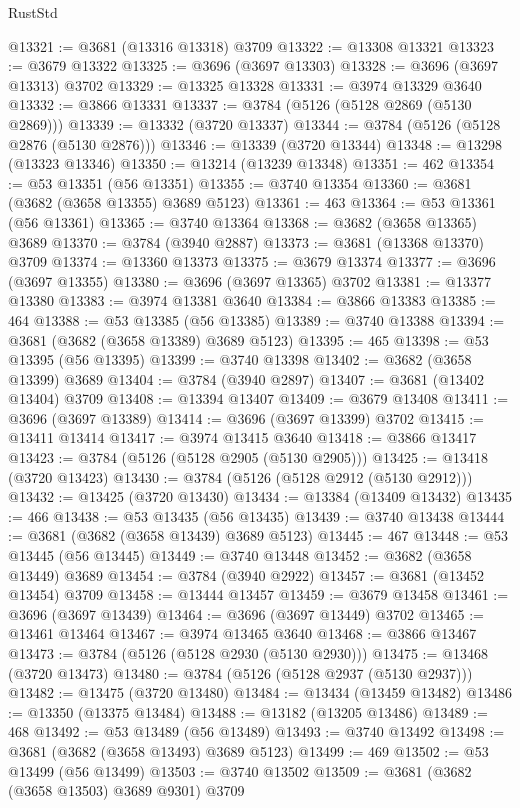 \begin{lexlean}{RustStd}
\begin{coremodule}
@13321 := @3681 (@13316 @13318) @3709
@13322 := @13308 @13321
@13323 := @3679 @13322
@13325 := @3696 (@3697 @13303)
@13328 := @3696 (@3697 @13313) @3702
@13329 := @13325 @13328
@13331 := @3974 @13329 @3640
@13332 := @3866 @13331
@13337 := @3784 (@5126 (@5128 @2869 (@5130 @2869)))
@13339 := @13332 (@3720 @13337)
@13344 := @3784 (@5126 (@5128 @2876 (@5130 @2876)))
@13346 := @13339 (@3720 @13344)
@13348 := @13298 (@13323 @13346)
@13350 := @13214 (@13239 @13348)
@13351 := 462
@13354 := @53 @13351 (@56 @13351)
@13355 := @3740 @13354
@13360 := @3681 (@3682 (@3658 @13355) @3689 @5123)
@13361 := 463
@13364 := @53 @13361 (@56 @13361)
@13365 := @3740 @13364
@13368 := @3682 (@3658 @13365) @3689
@13370 := @3784 (@3940 @2887)
@13373 := @3681 (@13368 @13370) @3709
@13374 := @13360 @13373
@13375 := @3679 @13374
@13377 := @3696 (@3697 @13355)
@13380 := @3696 (@3697 @13365) @3702
@13381 := @13377 @13380
@13383 := @3974 @13381 @3640
@13384 := @3866 @13383
@13385 := 464
@13388 := @53 @13385 (@56 @13385)
@13389 := @3740 @13388
@13394 := @3681 (@3682 (@3658 @13389) @3689 @5123)
@13395 := 465
@13398 := @53 @13395 (@56 @13395)
@13399 := @3740 @13398
@13402 := @3682 (@3658 @13399) @3689
@13404 := @3784 (@3940 @2897)
@13407 := @3681 (@13402 @13404) @3709
@13408 := @13394 @13407
@13409 := @3679 @13408
@13411 := @3696 (@3697 @13389)
@13414 := @3696 (@3697 @13399) @3702
@13415 := @13411 @13414
@13417 := @3974 @13415 @3640
@13418 := @3866 @13417
@13423 := @3784 (@5126 (@5128 @2905 (@5130 @2905)))
@13425 := @13418 (@3720 @13423)
@13430 := @3784 (@5126 (@5128 @2912 (@5130 @2912)))
@13432 := @13425 (@3720 @13430)
@13434 := @13384 (@13409 @13432)
@13435 := 466
@13438 := @53 @13435 (@56 @13435)
@13439 := @3740 @13438
@13444 := @3681 (@3682 (@3658 @13439) @3689 @5123)
@13445 := 467
@13448 := @53 @13445 (@56 @13445)
@13449 := @3740 @13448
@13452 := @3682 (@3658 @13449) @3689
@13454 := @3784 (@3940 @2922)
@13457 := @3681 (@13452 @13454) @3709
@13458 := @13444 @13457
@13459 := @3679 @13458
@13461 := @3696 (@3697 @13439)
@13464 := @3696 (@3697 @13449) @3702
@13465 := @13461 @13464
@13467 := @3974 @13465 @3640
@13468 := @3866 @13467
@13473 := @3784 (@5126 (@5128 @2930 (@5130 @2930)))
@13475 := @13468 (@3720 @13473)
@13480 := @3784 (@5126 (@5128 @2937 (@5130 @2937)))
@13482 := @13475 (@3720 @13480)
@13484 := @13434 (@13459 @13482)
@13486 := @13350 (@13375 @13484)
@13488 := @13182 (@13205 @13486)
@13489 := 468
@13492 := @53 @13489 (@56 @13489)
@13493 := @3740 @13492
@13498 := @3681 (@3682 (@3658 @13493) @3689 @5123)
@13499 := 469
@13502 := @53 @13499 (@56 @13499)
@13503 := @3740 @13502
@13509 := @3681 (@3682 (@3658 @13503) @3689 @9301) @3709

\end{coremodule}
\end{lexlean}
